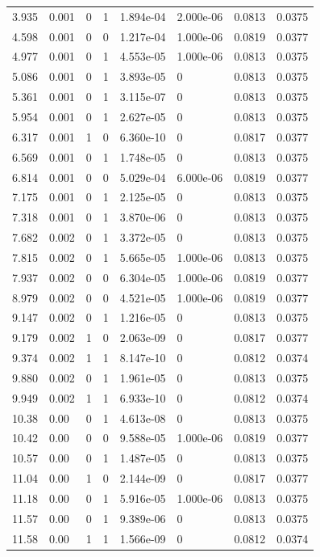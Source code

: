 \documentclass[preview]{standalone}
\begin{document}
{{\begin{tabular}{L{1.2cm}C{1.2cm} C{0.3cm}C{0.5cm} C{1.4cm}C{1.4cm} C{1.4cm}C{1.4cm}}
  3.935  &  0.001  & 0     &  1 &  1.894e-04  & 2.000e-06  & 0.0813 &  0.0375   \\ 
  4.598  &  0.001  & 0     &  0 &  1.217e-04  & 1.000e-06  & 0.0819 &  0.0377   \\ 
  4.977  &  0.001  & 0     &  1 &  4.553e-05  & 1.000e-06  & 0.0813 &  0.0375   \\ 
  5.086  &  0.001  & 0     &  1 &  3.893e-05  & 0  & 0.0813 &  0.0375   \\ 
  5.361  &  0.001  & 0     &  1 &  3.115e-07  & 0  & 0.0813 &  0.0375   \\ 
  5.954  &  0.001  & 0     &  1 &  2.627e-05  & 0  & 0.0813 &  0.0375   \\ 
  6.317  &  0.001  & 1     &  0 &  6.360e-10  & 0  & 0.0817 &  0.0377   \\ 
  6.569  &  0.001  & 0     &  1 &  1.748e-05  & 0  & 0.0813 &  0.0375   \\ 
  6.814  &  0.001  & 0     &  0 &  5.029e-04  & 6.000e-06  & 0.0819 &  0.0377   \\ 
  7.175  &  0.001  & 0     &  1 &  2.125e-05  & 0  & 0.0813 &  0.0375   \\ 
  7.318  &  0.001  & 0     &  1 &  3.870e-06  & 0  & 0.0813 &  0.0375   \\ 
  7.682  &  0.002  & 0     &  1 &  3.372e-05  & 0  & 0.0813 &  0.0375   \\ 
  7.815  &  0.002  & 0     &  1 &  5.665e-05  & 1.000e-06  & 0.0813 &  0.0375   \\ 
  7.937  &  0.002  & 0     &  0 &  6.304e-05  & 1.000e-06  & 0.0819 &  0.0377   \\ 
  8.979  &  0.002  & 0     &  0 &  4.521e-05  & 1.000e-06  & 0.0819 &  0.0377   \\ 
  9.147  &  0.002  & 0     &  1 &  1.216e-05  & 0  & 0.0813 &  0.0375   \\ 
  9.179  &  0.002  & 1     &  0 &  2.063e-09  & 0  & 0.0817 &  0.0377   \\ 
  9.374  &  0.002  & 1     &  1 &  8.147e-10  & 0  & 0.0812 &  0.0374   \\ 
  9.880  &  0.002  & 0     &  1 &  1.961e-05  & 0  & 0.0813 &  0.0375   \\ 
  9.949  &  0.002  & 1     &  1 &  6.933e-10  & 0  & 0.0812 &  0.0374   \\ 
  10.38  &  0.00  & 0     &  1 &  4.613e-08  & 0  & 0.0813 &  0.0375   \\ 
  10.42  &  0.00  & 0     &  0 &  9.588e-05  & 1.000e-06  & 0.0819 &  0.0377   \\ 
  10.57  &  0.00  & 0     &  1 &  1.487e-05  & 0  & 0.0813 &  0.0375   \\ 
  11.04  &  0.00  & 1     &  0 &  2.144e-09  & 0  & 0.0817 &  0.0377   \\ 
  11.18  &  0.00  & 0     &  1 &  5.916e-05  & 1.000e-06  & 0.0813 &  0.0375   \\ 
  11.57  &  0.00  & 0     &  1 &  9.389e-06  & 0  & 0.0813 &  0.0375   \\ 
  11.58  &  0.00  & 1     &  1 &  1.566e-09  & 0  & 0.0812 &  0.0374   \\ 
\hline 
\end{tabular} 

}}
\end{document}
